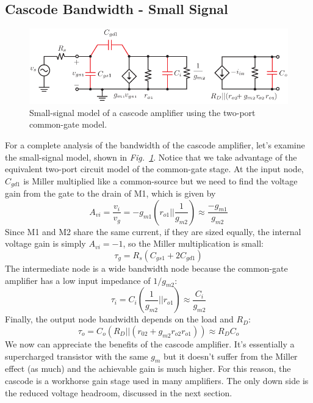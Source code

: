 \subsection{Cascode Bandwidth - Small Signal}
\begin{figure}[tb]
\centering
\includegraphics[scale=1]{14cascode_ac_ss}
\caption{Small-signal model of a cascode amplifier using the two-port common-gate model.} \label{fig:14cascode_ac_ss}
\end{figure}
For a complete analysis of the bandwidth of the cascode amplifier, let's examine the small-signal model, shown in \emph{Fig.~\ref{fig:14cascode_ac_ss}}.  Notice that we take advantage of the equivalent two-port circuit model of the common-gate stage.   At the input node, $C_{gd1}$ is Miller multiplied like a common-source but we need to find the voltage gain from the gate to the drain of M1, which is given by
    \begin{equation}
        A_{vi} = \frac{v_i}{v_g} = -g_{m1} \left( r_{o1} || \frac{1}{g_{m2}} \right) \approx \frac{-g_{m1}}{g_{m2}}
    \end{equation}
Since M1 and M2 share the same current, if they are sized equally, the internal voltage gain is simply $A_{vi} = -1$, so the Miller multiplication is small:
    \begin{equation}
        \tau_g = R_{s} (C_{gs1} + 2 C_{gd1})
    \end{equation}
The intermediate node is a wide bandwidth node because the common-gate amplifier has a low input impedance of $1/g_{m2}$:
    \begin{equation}
        \tau_i = C_i \left(\frac{1}{g_{m2}} || r_{o1}  \right) \approx \frac{C_i}{g_{m2}}
    \end{equation}  
Finally, the output node bandwidth depends on the load and $R_D$:
    \begin{equation}
        \tau_o = C_o (R_D || (r_{02} + g_{m2}r_{o2} r_{o1})) \approx R_D C_o
    \end{equation}
We now can appreciate the benefits of the cascode amplifier.  It's essentially a supercharged transistor with the same $g_m$ but it doesn't suffer from the Miller effect (as much) and the achievable gain is much higher.  For this reason, the cascode is a workhorse gain stage used in many amplifiers.  The only down side is the reduced voltage headroom, discussed in the next section.
